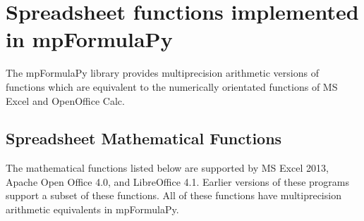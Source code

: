 \newpage
\section{Spreadsheet functions implemented in mpFormulaPy}
\label{Using Spreadsheet functions}
The mpFormulaPy library provides multiprecision arithmetic versions of  functions which are equivalent to the numerically orientated functions of MS Excel and OpenOffice Calc.


\subsection{Spreadsheet Mathematical Functions}
The mathematical functions listed below are supported by MS Excel 2013, Apache Open Office 4.0, and LibreOffice 4.1. Earlier versions of these programs support a subset of these functions.
All of these functions have multiprecision arithmetic equivalents in mpFormulaPy.


